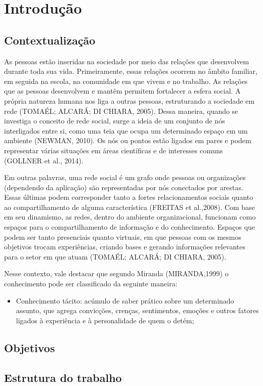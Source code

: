 \chapter{Introdução}
\section{Contextualizaç\~ao}

As pessoas estão inseridas na sociedade por meio das relações que desenvolvem durante toda sua vida. Primeiramente, essas relações ocorrem no âmbito familiar, em seguida na escola, na comunidade em que vivem e no trabalho. As relações que as pessoas desenvolvem e mantêm permitem fortalecer a esfera social. A própria natureza humana nos liga a outras pessoas, estruturando a sociedade em rede (TOMAÉL; ALCARÁ; DI CHIARA, 2005). Dessa maneira, quando se investiga o conceito de rede social, surge a ideia de um conjunto de nós interligados entre si, como uma teia que ocupa um determinado espaço em um ambiente (NEWMAN, 2010). Os nós ou pontos estão ligados em pares e podem representar várias situações em áreas científicas e de interesses comuns (GOLLNER et al., 2014).

Em outras palavras, uma rede social é um grafo onde pessoas ou organizações (dependendo da aplicação) são representadas por nós conectados por arestas. Essas últimas podem corresponder tanto a fortes relacionamentos sociais quanto ao compartilhamento de alguma característica (FREITAS et al.,2008). Com base em seu dinamismo, as redes, dentro do ambiente organizacional, funcionam como espaços para o compartilhamento de informação e do conhecimento. Espaços que podem ser tanto presenciais quanto virtuais, em que pessoas com os mesmos objetivos trocam experiências, criando bases e gerando informações relevantes para o setor em que atuam (TOMAÉL; ALCARÁ; DI CHIARA, 2005).

Nesse contexto, vale destacar que segundo Miranda (MIRANDA,1999) o conhecimento pode ser classificado da seguinte maneira:
	\begin{itemize}
	\item Conhecimento tácito:  acúmulo de saber prático sobre um determinado assunto, que agrega 			     convicções, crenças, sentimentos, emoções e outros fatores ligados à experiência e à personalidade        	 de quem o detém;
	\end{itemize}

\section{Objetivos}



\section{Estrutura do trabalho}


